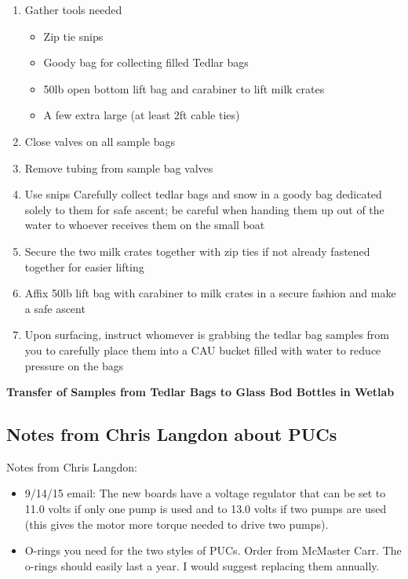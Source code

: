 \documentclass[
]{book}
\providecommand{\tightlist}{%
  \setlength{\itemsep}{0pt}\setlength{\parskip}{0pt}}
\begin{document}
\begin{enumerate}
\def\labelenumi{\arabic{enumi}.}
\tightlist
\item
  Gather tools needed

  \begin{itemize}
  \tightlist
  \item
    Zip tie snips
  \item
    Goody bag for collecting filled Tedlar bags
  \item
    50lb open bottom lift bag and carabiner to lift milk crates
  \item
    A few extra large (at least 2ft cable ties)
  \end{itemize}
\item
  Close valves on all sample bags
\item
  Remove tubing from sample bag valves
\item
  Use snips Carefully collect tedlar bags and snow in a goody bag dedicated solely to them for safe ascent; be careful when handing them up out of the water to whoever receives them on the small boat
\item
  Secure the two milk crates together with zip ties if not already fastened together for easier lifting
\item
  Affix 50lb lift bag with carabiner to milk crates in a secure fashion and make a safe ascent
\item
  Upon surfacing, instruct whomever is grabbing the tedlar bag samples from you to carefully place them into a CAU bucket filled with water to reduce pressure on the bags
\end{enumerate}

\textbf{Transfer of Samples from Tedlar Bags to Glass Bod Bottles in Wetlab}

\hypertarget{notes-from-chris-langdon-about-pucs}{%
\subsection{Notes from Chris Langdon about PUCs}\label{notes-from-chris-langdon-about-pucs}}

Notes from Chris Langdon:

\begin{itemize}
\tightlist
\item
  9/14/15 email: The new boards have a voltage regulator that can be set to 11.0 volts if only one pump is used and to 13.0 volts if two pumps are used (this gives the motor more torque needed to drive two pumps).
\item
  O-rings you need for the two styles of PUCs. Order from McMaster Carr. The o-rings should easily last a year. I would suggest replacing them annually.
\end{itemize}
\end{document}
